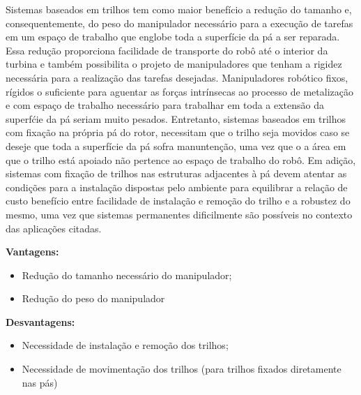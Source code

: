 Sistemas baseados em trilhos tem como maior benefício a redução do tamanho e,
consequentemente, do peso do manipulador necessário para a execução de tarefas
em um espaço de trabalho que englobe toda a superfície da pá a ser reparada.
Essa redução proporciona facilidade de transporte do robô até o interior da
turbina e também possibilita o projeto de manipuladores que tenham a rigidez
necessária para a realização das tarefas desejadas. Manipuladores
robótico fixos, rígidos o suficiente para aguentar as forças intrínsecas ao
processo de metalização e com espaço de trabalho necessário para trabalhar em
toda a extensão da superfćie da pá seriam muito pesados.
Entretanto, sistemas baseados em trilhos com fixação na própria pá do rotor, necessitam que
o trilho seja movidos caso se deseje que toda a superfície da pá sofra
manuntenção, uma vez que o a área em que o trilho está apoiado não pertence ao espaço de
trabalho do robô. Em adição, sistemas com fixação de trilhos nas estruturas
adjacentes à pá devem atentar as condições para a instalação dispostas pelo
ambiente para equilibrar a relação de custo benefício entre facilidade de
instalação e remoção do trilho e a robustez do mesmo, uma vez que sistemas
permanentes dificilmente são possíveis no contexto das aplicações citadas.

\textbf{Vantagens:}
\begin{itemize}
  \item Redução do tamanho necessário do manipulador;
  \item Redução do peso do manipulador
\end{itemize}

\textbf{Desvantagens:}
\begin{itemize}
  \item Necessidade de instalação e remoção dos trilhos;
  \item Necessidade de movimentação dos trilhos (para trilhos fixados
  diretamente nas pás)
\end{itemize}



